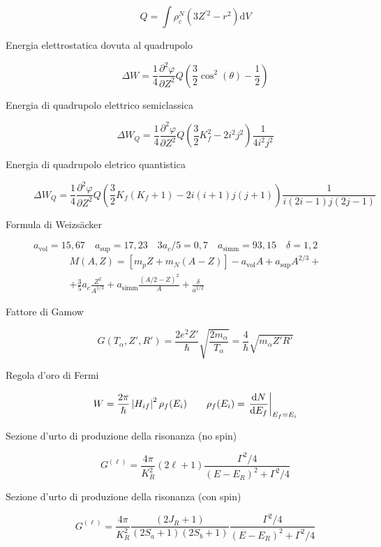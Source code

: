 \begin{description}
\begin{equation}
	  Q = \int \rho_c^N(3Z^{\prime 2}-r^2)\text{d}V
	\end{equation}
  \item[Energia elettrostatica dovuta al quadrupolo]
	\begin{equation}
	  \Delta W = \frac{1}{4}\frac{\partial^2\varphi}{\partial
	  Z^2}Q\left( \frac{3}{2}\cos^2(\theta) - \frac{1}{2} \right)
	\end{equation}
  \item[Energia di quadrupolo elettrico semiclassica]
	\begin{equation}
	  \Delta W_Q = \frac{1}{4}\frac{\partial^2\varphi}{\partial Z^2}Q\left(
	  \frac{3}{2}K_f^2-2i^2j^2 \right)\frac{1}{4i^2j^2}
	\end{equation}
  \item[Energia di quadrupolo eletrico quantistica]
	\begin{equation}
	  \Delta W_Q = \frac{1}{4}\frac{\partial^2 \varphi}{\partial Z^2}Q\left(
	  \frac{3}{2}K_f(K_f+1)-2i(i+1)j(j+1)
	  \right)\frac{1}{i(2i-1)j(2j-1)}
	\end{equation}
  \item[Formula di Weizs\"acker] $a_\text{vol}=15,67\quad a_\text{sup} =
	17,23\quad 3a_c/5 = 0,7\quad a_\text{simm} = 93,15\quad \delta = 1,2$
	\begin{multline}
	  M(A,Z) = \left[ m_pZ + m_N(A-Z) \right] -a_\text{vol}A +
	  a_\text{sup}A^{2/3}+\\
	  +\frac{3}{5}a_c\frac{Z^2}{A^{1/3}} +
	  a_\text{simm}\frac{(A/2-Z)^2}{A} + \frac{\delta}{a^{1/2}}
	\end{multline}
  \item[Fattore di Gamow]
	\begin{equation}
	  G(T_\alpha,Z',R') =
	  \frac{2e^2Z'}{\hslash}\sqrt{\frac{2m_\alpha}{T_\alpha}} =
	  \frac{4}{\hslash}\sqrt{m_\alpha Z'R'}
	\end{equation}
  \item[Regola d'oro di Fermi]
	\begin{equation}
	  W = \frac{2\pi}{\hslash}\left| H_{if} \right|^2\rho_f(E_i)\qquad \rho_f(E_i) =
	  \left.\frac{\text{d}N}{\text{d}E_f}\right|_{E_f=E_i}
	\end{equation}
  \item[Sezione d'urto di produzione della risonanza (no spin)]
	\begin{equation}
	  G^{(\ell)} = \frac{4\pi}{K^2_R}(2\ell +
	  1)\frac{\Gamma^2/4}{(E-E_R)^2+\Gamma^2/4}
	\end{equation}
  \item[Sezione d'urto di produzione della risonanza (con spin)]
	\begin{equation}
	  G^{(\ell)} = \frac{4\pi}{K^2_R}
	  \frac{(2J_R + 1)}{(2S_a + 1)(2S_b + 1)}\frac{\Gamma^2/4}{(E-E_R)^2+\Gamma^2/4}
	\end{equation}
\end{description}
